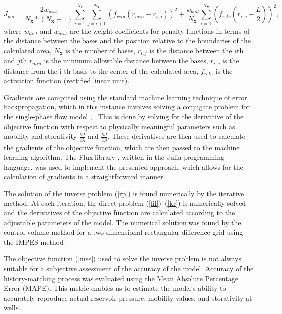 \documentclass[
11pt,%
tightenlines,%
twoside,%
onecolumn,%
nofloats,%
nobibnotes,%
nofootinbib,%
superscriptaddress,%
noshowpacs,%
centertags]%
{revtex4}
\begin{document}
\begin{equation} \label{pnl}
	J_{pnl}=\frac{2w_{dist}}{N_\textbf{x}*(N_\textbf{x}-1)}\sum_{i=1}^{N_\textbf{x}}{\sum_{j=i+1 }^{N_\textbf{x}}{\left(f_{relu}\left(r_{min} - r_{i,j}\right)\right)^2}} + 
	\frac{w_{bnd}}{N_\textbf{x}}\sum_{i=1}^{N_\textbf{x}}{\left(f_{relu}\left(r_{i,c} - \frac{L}{2}\right)\right)^2},
\end{equation}
where $w_{dist}$ and $w_{dist}$ are the weight coefficients for penalty functions in terms of the distance between the bases and the position relative to the boundaries of the calculated area, $N_\textbf{x}$ is the number of bases, $r_{i,j}$ is the distance between the $i$th and $j$th $r_{min}$ is the minimum allowable distance between the bases, $r_{i,c}$ is the distance from the i-th basis to the center of the calculated area, $f_{relu}$ is the activation function (rectified linear unit).

Gradients are computed using the standard machine learning technique of error backpropagation, which in this instance involves solving a conjugate problem for the single-phase flow model  \cite{kos3}, \cite{far}. This is done by solving for the derivative of the objective function with respect to physically meaningful parameters such as mobility and storativity $\frac{\partial J}{\partial \lambda}$ and $\frac{\partial J}{\partial \beta}$. These derivatives are then used to calculate the gradients of the objective function, which are then passed to the machine learning algorithm. The Flux library \cite{inn}, written in the Julia programming language, was used to implement the presented approach, which allows for the calculation of gradients in a straightforward manner.


The solution of the inverse problem (\ref{rp}) is found  numerically
by the iterative method. At each iteration, the direct problem
(\ref{fil})--(\ref{kr}) is numerically solved and the derivatives of
the objective function are calculated according to the adjustable
parameters of the model. The numerical solution was found
by the control volume method for a two-dimensional rectangular
difference grid using the IMPES method \cite{azi}.

The objective function ({\ref{mse}}) used to solve the inverse problem is not always suitable for a subjective assessment of the accuracy of the model. Accuracy of the history-matching process was evaluated using the Mean Absolute Percentage Error (MAPE). This metric enables us to estimate the model's ability to accurately reproduce actual reservoir pressure, mobility values, and storativity at wells.
\end{document}
